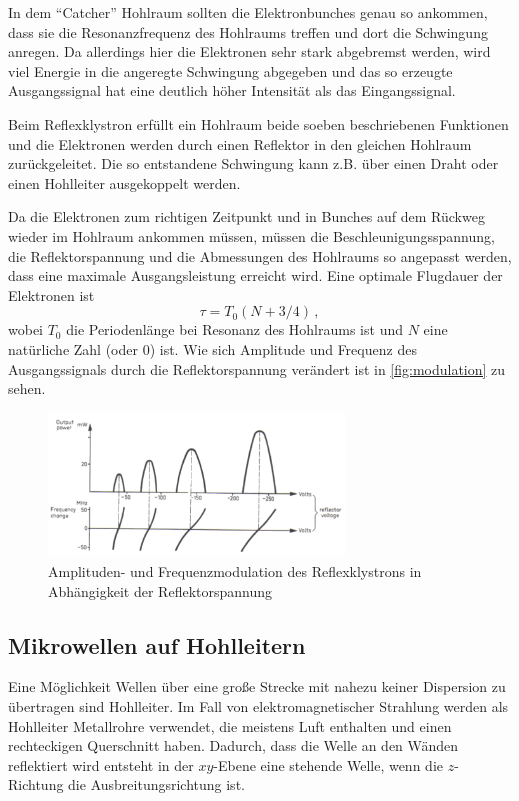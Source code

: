 In dem \enquote{Catcher} Hohlraum sollten die Elektronbunches genau so ankommen, dass sie die Resonanzfrequenz des Hohlraums treffen und dort die Schwingung anregen.
Da allerdings hier die Elektronen sehr stark abgebremst werden, wird viel Energie in die angeregte Schwingung abgegeben 
und das so erzeugte Ausgangssignal hat eine deutlich höher Intensität als das Eingangssignal.

Beim Reflexklystron erfüllt ein Hohlraum beide soeben beschriebenen Funktionen und die Elektronen werden durch einen Reflektor in den gleichen Hohlraum zurückgeleitet.
Die so entstandene Schwingung kann z.B. über einen Draht oder einen Hohlleiter ausgekoppelt werden.

Da die Elektronen zum richtigen Zeitpunkt und in Bunches auf dem Rückweg wieder im Hohlraum ankommen müssen, 
müssen die Beschleunigungsspannung, die Reflektorspannung und die Abmessungen des Hohlraums
so angepasst werden, dass eine maximale Ausgangsleistung erreicht wird.
Eine optimale Flugdauer der Elektronen ist 
\begin{equation}
    \tau = T_0 (N+3/4) \, ,
\end{equation}
wobei $T_0$ die Periodenlänge bei Resonanz des Hohlraums ist und $N$ eine natürliche Zahl (oder 0) ist.
Wie sich Amplitude und Frequenz des Ausgangssignals durch die Reflektorspannung verändert ist in \autoref{fig:modulation} zu sehen.

\begin{figure}
    \centering
    \includegraphics[width=0.7\textwidth]{images/modulation_white.png}
    \caption{Amplituden- und Frequenzmodulation des Reflexklystrons in Abhängigkeit der Reflektorspannung \cite{V53_old}}
    \label{fig:modulation}
\end{figure}

\subsection{Mikrowellen auf Hohlleitern}
\label{ssec:Hohlleiter}

Eine Möglichkeit Wellen über eine große Strecke mit nahezu keiner Dispersion zu übertragen sind Hohlleiter.
Im Fall von elektromagnetischer Strahlung werden als Hohlleiter Metallrohre verwendet, die meistens Luft enthalten und einen rechteckigen Querschnitt haben.
Dadurch, dass die Welle an den Wänden reflektiert wird entsteht in der $xy$-Ebene eine stehende Welle, wenn die $z$-Richtung die Ausbreitungsrichtung ist.

